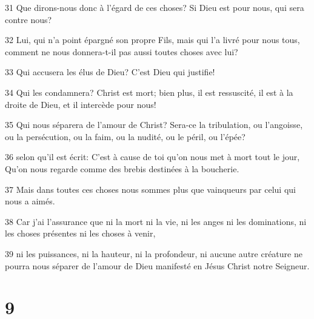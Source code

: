 \par 31 Que dirons-nous donc à l'égard de ces choses? Si Dieu est pour nous, qui sera contre nous?
\par 32 Lui, qui n'a point épargné son propre Fils, mais qui l'a livré pour nous tous, comment ne nous donnera-t-il pas aussi toutes choses avec lui?
\par 33 Qui accusera les élus de Dieu? C'est Dieu qui justifie!
\par 34 Qui les condamnera? Christ est mort; bien plus, il est ressuscité, il est à la droite de Dieu, et il intercède pour nous!
\par 35 Qui nous séparera de l'amour de Christ? Sera-ce la tribulation, ou l'angoisse, ou la persécution, ou la faim, ou la nudité, ou le péril, ou l'épée?
\par 36 selon qu'il est écrit: C'est à cause de toi qu'on nous met à mort tout le jour, Qu'on nous regarde comme des brebis destinées à la boucherie.
\par 37 Mais dans toutes ces choses nous sommes plus que vainqueurs par celui qui nous a aimés.
\par 38 Car j'ai l'assurance que ni la mort ni la vie, ni les anges ni les dominations, ni les choses présentes ni les choses à venir,
\par 39 ni les puissances, ni la hauteur, ni la profondeur, ni aucune autre créature ne pourra nous séparer de l'amour de Dieu manifesté en Jésus Christ notre Seigneur.

\chapter{9}

